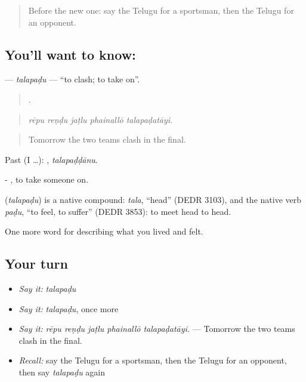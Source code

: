 \label{lesson:TE-C544-talapadu}



\begin{quote}
Before the new one: say the Telugu for a sportsman, then the Telugu for an opponent.
\end{quote}

\subsection*{You'll want to know: }
\textbf{} — \emph{talapaḍu} — \textquotedblleft{}to clash; to take on\textquotedblright{}.

\begin{quote}
    .
\end{quote}

\begin{quote}
\emph{rēpu reṇḍu jaṭlu phainallō talapaḍatāyi.}
\end{quote}

\begin{quote}
Tomorrow the two teams clash in the final.
\end{quote}

Past (I …): , \emph{talapaḍḍānu}.

- , to take someone on.

\begin{cousinweb}
\textbf{} (\emph{talapaḍu}) is a native compound: \emph{tala}, \textquotedblleft{}head\textquotedblright{} (DEDR 3103), and the native verb \emph{paḍu}, \textquotedblleft{}to feel, to suffer\textquotedblright{} (DEDR 3853): to meet head to head.
\end{cousinweb}

\begin{grammarlens}[title={What you've built}]
One more word for describing what you lived and felt.
\end{grammarlens}

\subsection*{Your turn}
\begin{itemize}
\raggedright
  \item \emph{Say it:} \emph{talapaḍu}
  \item \emph{Say it:} \emph{talapaḍu}, once more
  \item \emph{Say it:} \emph{rēpu reṇḍu jaṭlu phainallō talapaḍatāyi.} — Tomorrow the two teams clash in the final.
  \item \emph{Recall:} say the Telugu for a sportsman, then the Telugu for an opponent, then say \emph{talapaḍu} again
\end{itemize}

